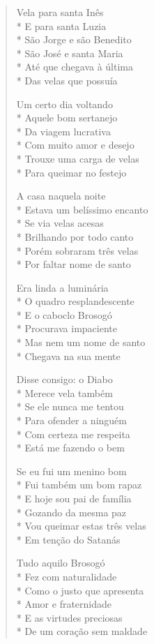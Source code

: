 \begin{verse}
Vela para santa Inês\\*
E para santa Luzia\\*
São Jorge e são Benedito\\*
São José e santa Maria\\*
Até que chegava à última\\*
Das velas que possuía

Um certo dia voltando\\*
Aquele bom sertanejo\\*
Da viagem lucrativa\\*
Com muito amor e desejo\\*
Trouxe uma carga de velas\\*
Para queimar no festejo

A casa naquela noite\\*
Estava um belíssimo encanto\\*
Se via velas acesas\\*
Brilhando por todo canto\\*
Porém sobraram três velas\\*
Por faltar nome de santo

Era linda a luminária\\*
O quadro resplandescente\\*
E o caboclo Brosogó\\*
Procurava impaciente\\*
Mas nem um nome de santo\\*
Chegava na sua mente

Disse consigo: o Diabo\\*
Merece vela também\\*
Se ele nunca me tentou\\*
Para ofender a ninguém\\*
Com certeza me respeita\\*
Está me fazendo o bem

Se eu fui um menino bom\\*
Fui também um bom rapaz\\*
E hoje sou pai de família\\*
Gozando da mesma paz\\*
Vou queimar estas três velas\\*
Em tenção do Satanás

Tudo aquilo Brosogó\\*
Fez com naturalidade\\*
Como o justo que apresenta\\*
Amor e fraternidade\\*
E as virtudes preciosas\\*
De um coração sem maldade


\end{verse}

